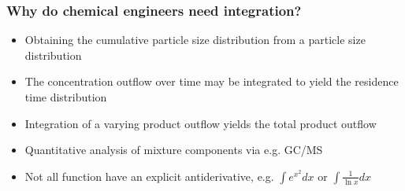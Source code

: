 \documentclass[11pt,table,final,fleqn,xcolor={usenames,dvipsnames,table}]{beamer}
\begin{document}
\begin{frame}
  \frametitle{Why do chemical engineers need integration?}
  \begin{itemize}
     \item Obtaining the cumulative particle size distribution from a particle size distribution
     \item The concentration outflow over time may be integrated to yield the residence time distribution
     \item Integration of a varying product outflow yields the total product outflow
     \item Quantitative analysis of mixture components via e.g. GC/MS
     \item Not all function have an explicit antiderivative, e.g. $\int e^{x^2} dx$ or $\int \frac{1}{\ln x}dx$
  \end{itemize}
\end{frame}
\end{document}
